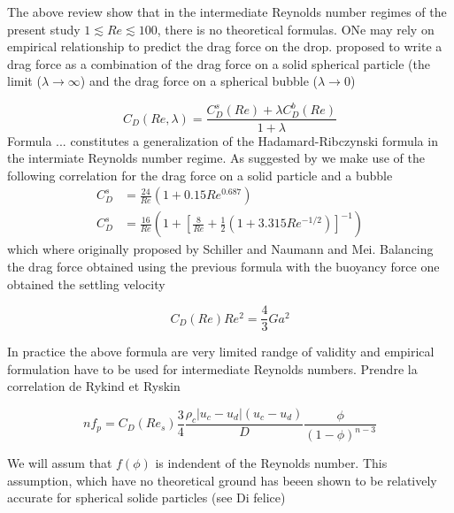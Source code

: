 The above review show that in the intermediate Reynolds number regimes of the present study $ 1 \lesssim Re \lesssim 100$, there is no theoretical formulas. ONe may rely on empirical relationship to predict the drag force on the drop. \citet{rivkind1970} proposed to write a drag force as a combination of the drag force on a solid spherical particle
(the limit ($\lambda \rightarrow \infty$) and the drag force on a spherical bubble ($\lambda \rightarrow 0$)

\begin{equation}
C_D(Re,\lambda) = \frac{C_{D}^s(Re)+\lambda C_{D}^b(Re)}{1+\lambda}
\end{equation}
Formula ... constitutes a generalization of the Hadamard-Ribczynski formula in the intermiate Reynolds number regime. As suggested by \citet{magnaudet1997} we make use of the following correlation for the drag force on a solid particle and a bubble
\begin{align}
C_D ^s &= \frac{24}{Re}(1+0.15Re^{0.687}) \\
C_D ^s &= \frac{16}{Re}\left(1+\left[\frac{8}{Re}+\frac{1}{2}\left(1+3.315Re^{-1/2}\right)\right]^{-1}\right)
\end{align}
which where originally proposed by Schiller and Naumann and Mei. Balancing the drag force obtained using the previous formula with the buoyancy force one obtained the settling velocity

\begin{equation}
C_D(Re)Re^2=\frac{4}{3}Ga ^2
\label{}
\end{equation}





In practice the above formula are very limited randge of validity and empirical formulation have to be used for intermediate Reynolds numbers. Prendre la correlation de Rykind et Ryskin


\begin{equation}
nf_p = C_D(Re_s)\frac{3}{4}\frac{\rho _c |u_c-u_d|(u_c-u_d)}{D}\frac{\phi}{(1-\phi)^{n-3}}
\end{equation}



We will assum that $f(\phi)$ is indendent of the Reynolds number. This assumption, which have no theoretical ground has beeen shown to be relatively accurate for spherical solide particles (see Di felice)



